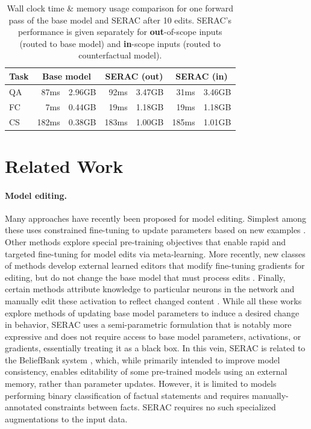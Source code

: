 \documentclass{article}
\newcommand{\name}{SERAC}
\begin{document}
{
\setlength{\tabcolsep}{3pt}
\begin{table}
\small
    \centering
    \begin{tabular}{lrrrrrr}
        \toprule
        Task & \multicolumn{2}{c}{Base model} & \multicolumn{2}{c}{SERAC (\textbf{out})} & \multicolumn{2}{c}{SERAC (\textbf{in})} \\
        \midrule
        QA & 87ms & 2.96GB & 92ms & 3.47GB & 31ms & 3.46GB \\
        \midrule
        FC & 7ms & 0.44GB & 19ms & 1.18GB & 19ms & 1.18GB \\
        \midrule
        CS & 182ms & 0.38GB & 183ms & 1.00GB & 185ms & 1.01GB \\
        \bottomrule
    \end{tabular}
    \caption{Wall clock time \& memory usage comparison for one forward pass of the base model and {\name} after 10 edits. \name's performance is given separately for \textbf{out}-of-scope inputs (routed to base model) and \textbf{in}-scope inputs (routed to counterfactual model).}
    \label{tab:compute-stats}
\end{table}
}


\section{Related Work}

\paragraph{Model editing.} Many approaches have recently been proposed for model editing. Simplest among these uses constrained fine-tuning to update parameters based on new examples \citep{sotoudeh2019correcting,zhu2020modifying}. Other methods explore special pre-training objectives that enable rapid and targeted  
fine-tuning for model edits \citep{Sinitsin2020Editable} via meta-learning. More recently, new classes of methods develop external learned editors that modify fine-tuning gradients for editing, but do not change the base model that must process edits \citep{Cao2021EditingFK,mitchell2021fast,hase2021language}. Finally, certain methods attribute knowledge to particular neurons in the network and manually edit these activation to reflect changed content \citep{dai2021knowledge,meng2022locating}. While all these works explore methods of updating base model parameters to induce a desired change in behavior, {\name} uses a semi-parametric formulation that is notably more expressive and does not require access to base model parameters, activations, or gradients, essentially treating it as a black box. In this vein, {\name} is related to the BeliefBank system \citep{kassner-etal-2021-beliefbank}, which, while primarily intended to improve model consistency, enables editability of some pre-trained models using an external memory, rather than parameter updates. However, it is limited to models performing binary classification of factual statements and requires manually-annotated constraints between facts. {\name} requires no such specialized augmentations to the input data.
\end{document}
